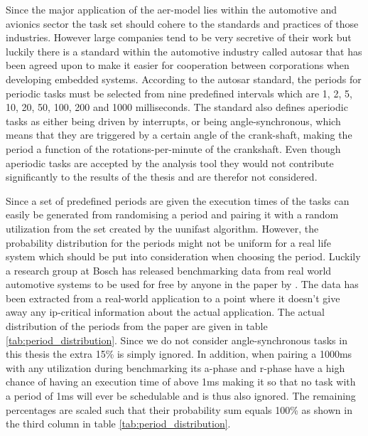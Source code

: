 \documentclass{kththesis}
\begin{document}
Since the major application of the \acrshort{aer}-model lies within the automotive and avionics
sector the task set should cohere to the standards and practices of those industries. However large
companies tend to be very secretive of their work but luckily there is a standard within the
automotive industry called \acrshort{autosar} that has been agreed upon to make it easier for
cooperation between corporations when developing embedded systems. According to the
\acrshort{autosar} standard, the periods for periodic tasks must be selected from nine predefined
intervals which are 1, 2, 5, 10, 20, 50, 100, 200 and 1000 milliseconds. The standard also defines
aperiodic tasks as either being driven by interrupts, or being angle-synchronous, which means that
they are triggered by a certain angle of the crank-shaft, making the period a function of the
rotations-per-minute of the crankshaft. Even though aperiodic tasks are accepted by the analysis
tool they would not contribute significantly to the results of the thesis and are therefor not
considered.

Since a set of predefined periods are given the execution times of the tasks can easily be generated
from randomising a period and pairing it with a random utilization from the set created by the
uunifast algorithm. However, the probability distribution for the periods might not be uniform for a
real life system which should be put into consideration when choosing the period. Luckily a research
group at Bosch has released benchmarking data from real world automotive systems to be used for
free by anyone in the paper by \textcite{kramer_real_2015}. The data has been extracted from a
real-world application to a point where it doesn't give away any \acrfull{ip}-critical
information about the actual application. The actual distribution of the periods from the paper are
given in table \ref{tab:period_distribution}. Since we do not consider angle-synchronous tasks in
this thesis the extra 15\% is simply ignored. In addition, when pairing a 1000ms with any
utilization during benchmarking its \acrshort{a}-phase and \acrshort{r}-phase have a high chance of
having an execution time of above 1ms making it so that no task with a period of 1ms will ever be
schedulable and is thus also ignored. The remaining percentages are scaled such that their
probability sum equals 100\% as shown in the third column in table \ref{tab:period_distribution}.
\end{document}
